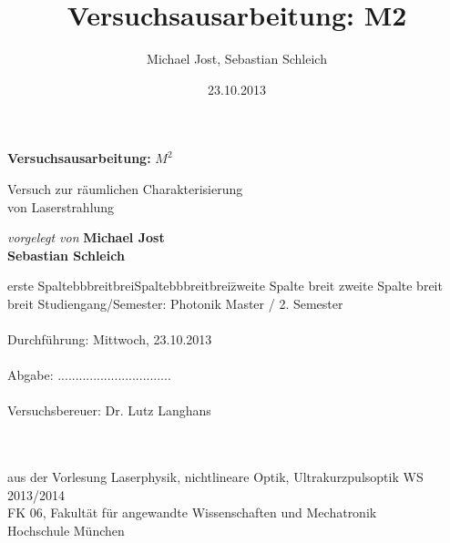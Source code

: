 
\begin{titlepage}
\title{Versuchsausarbeitung: M2}
\author{Michael Jost, Sebastian Schleich}
\date{23.10.2013}
\begin{center} 
\label{titelpage}
\vfill{}{\Huge \bf Versuchsausarbeitung:}
\vfill{}{\Huge \bf $M^2$}

\vfill{}{\huge Versuch zur räumlichen Charakterisierung\\
				von Laserstrahlung}
		
\vfill{\it vorgelegt von} 
\vfill{\bf Michael Jost\\Sebastian Schleich}

\end{center}
\vfill{}{}
\begin{tabbing}

erste SpaltebbbreitbreiSpaltebbbreitbrei\= zweite Spalte breit zweite Spalte breit breit\kill
Studiengang/Semester:		\> Photonik Master / 2. Semester\\ \\
Durchführung:				\> Mittwoch, 23.10.2013\\ \\
Abgabe:						\>................................  \\ \\
Versuchsbereuer:			\>  Dr. Lutz Langhans\\
\\ \\
\end{tabbing}
\begin{center}
aus der Vorlesung Laserphysik, nichtlineare Optik, Ultrakurzpulsoptik WS 2013/2014\\
FK 06, Fakultät für angewandte Wissenschaften und Mechatronik\\
Hochschule München
\end{center}
\end{titlepage}